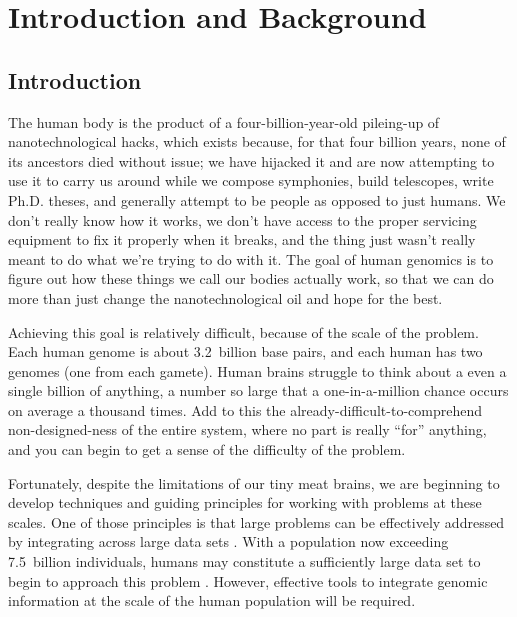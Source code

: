 \chapter{Introduction and Background}

\section{Introduction}

The human body is the product of a four-billion-year-old pileing-up of nanotechnological hacks, which exists because, for that four billion years, none of its ancestors died without issue; we have hijacked it and are now attempting to use it to carry us around while we compose symphonies, build telescopes, write Ph.D. theses, and generally attempt to be people as opposed to just humans. We don't really know how it works, we don't have access to the proper servicing equipment to fix it properly when it breaks, and the thing just wasn't really meant to do what we're trying to do with it. The goal of human genomics is to figure out how these things we call our bodies actually work, so that we can do more than just change the nanotechnological oil and hope for the best.

Achieving this goal is relatively difficult, because of the scale of the problem. Each human genome is about 3.2~billion base pairs, and each human has two genomes (one from each gamete). %
Human brains struggle to think about a even a single billion of anything, a number so large that a one-in-a-million chance occurs on average a thousand times. Add to this the already-difficult-to-comprehend non-designed-ness of the entire system, where no part is really ``for'' anything, and you can begin to get a sense of the difficulty of the problem.

Fortunately, despite the limitations of our tiny meat brains, we are beginning to develop techniques and guiding principles for working with problems at these scales. One of those principles is that large problems can be effectively addressed by integrating across large data sets \cite{halevy2009unreasonable}. With a population now exceeding 7.5~billion individuals, humans may constitute a sufficiently large data set to begin to approach this problem \cite{talton2017economics}. However, effective tools to integrate genomic information at the scale of the human population will be required.

